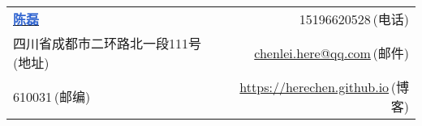 \newcommand{\myheader}{
\begin{tabular*}{\textwidth}{l@{\extracolsep{\fill}}r}
  \textbf{\href{https://herechen.github.io}{\LARGE \textcolor{highlight}{陈磊}}} & 15196620528$\,${\color{labelgrey}(电话)} \\
  四川省成都市二环路北一段111号$\,${\color{labelgrey}(地址)} & \href{mailto:chenlei.here@qq.com}{chenlei.here@qq.com}$\,${\color{labelgrey}(邮件)} \\
  610031$\,${\color{labelgrey}(邮编)} & \href{https://herechen.github.io}{https://herechen.github.io}$\,${\color{labelgrey}(博客)} \\
  \end{tabular*}\\\vspace{0.1in}}

\myheader